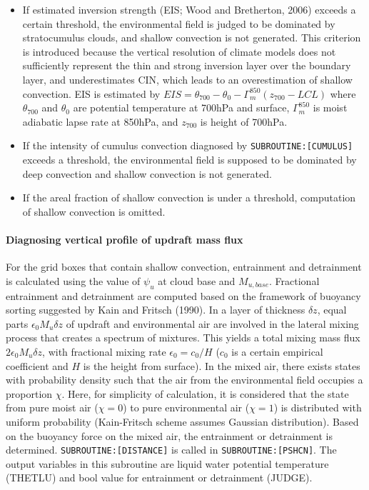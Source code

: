 \begin{itemize}
\item
  If estimated inversion strength (EIS; Wood and Bretherton, 2006) exceeds a certain threshold, the environmental field is judged to be dominated by stratocumulus clouds, and shallow convection is not
  generated. This criterion is introduced because the vertical resolution of climate models does not sufficiently represent the thin and strong inversion layer over the boundary layer, and
  underestimates CIN, which leads to an overestimation of shallow convection. EIS is estimated by \(EIS=\theta_{700}-\theta_{0}-\Gamma_m^{850}(z_{700}-LCL)\) where \(\theta_{700}\) and \(\theta_0\)
  are potential temperature at 700hPa and surface, \(\Gamma_m^{850}\) is moist adiabatic lapse rate at 850hPa, and \(z_{700}\) is height of 700hPa.
\item
  If the intensity of cumulus convection diagnosed by \texttt{SUBROUTINE:{[}CUMULUS{]}} exceeds a threshold, the environmental field is supposed to be dominated by deep convection and shallow
  convection is not generated.
\item
  If the areal fraction of shallow convection is under a threshold, computation of shallow convection is omitted.
\end{itemize}

\hypertarget{diagnosing-vertical-profile-of-updraft-mass-flux}{%
\paragraph{Diagnosing vertical profile of updraft mass flux}\label{diagnosing-vertical-profile-of-updraft-mass-flux}}

For the grid boxes that contain shallow convection, entrainment and detrainment is calculated using the value of \(\psi_u\) at cloud base and \(M_{u,base}\). Fractional entrainment and detrainment are
computed based on the framework of buoyancy sorting suggested by Kain and Fritsch (1990). In a layer of thickness \(\delta z\), equal parts \(\epsilon_0 M_u \delta z\) of updraft and environmental air
are involved in the lateral mixing process that creates a spectrum of mixtures. This yields a total mixing mass flux \(2\epsilon_0 M_u \delta z\), with fractional mixing rate \(\epsilon_0=c_0/H\)
(\(c_0\) is a certain empirical coefficient and \(H\) is the height from surface). In the mixed air, there exists states with probability density such that the air from the environmental field
occupies a proportion \(\chi\). Here, for simplicity of calculation, it is considered that the state from pure moist air (\(\chi=0\)) to pure environmental air (\(\chi=1\)) is distributed with uniform
probability (Kain-Fritsch scheme assumes Gaussian distribution). Based on the buoyancy force on the mixed air, the entrainment or detrainment is determined. \texttt{SUBROUTINE:{[}DISTANCE{]}} is
called in \texttt{SUBROUTINE:{[}PSHCN{]}}. The output variables in this subroutine are liquid water potential temperature (THETLU) and bool value for entrainment or detrainment (JUDGE).

